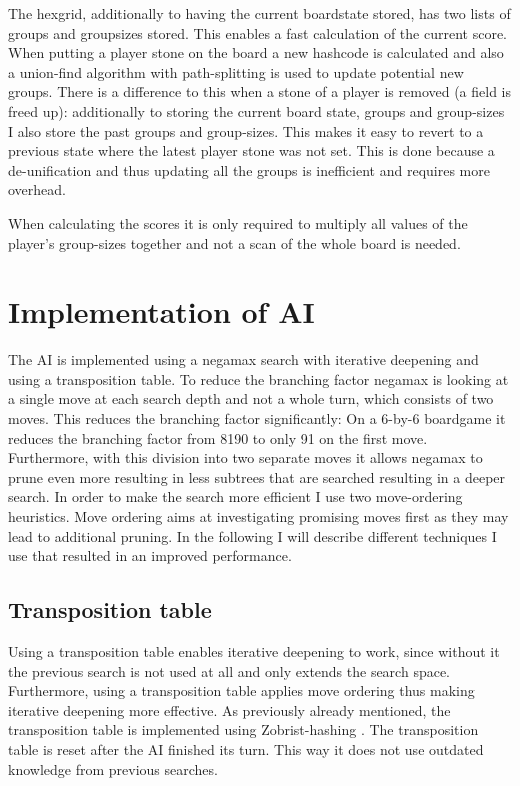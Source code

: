 \documentclass[a4paper]{article}
\begin{document}
The hexgrid, additionally to having the current boardstate stored, has two lists of groups and groupsizes stored. This enables a fast calculation of the current score. When putting a player stone on the board a new hashcode is calculated and also a union-find algorithm \cite{galler1964improved} with path-splitting is used to update potential new groups. There is a difference to this when a stone of a player is removed (a field is freed up): additionally to storing the current board state, groups and group-sizes I also store the past groups and group-sizes. This makes it easy to revert to a previous state where the latest player stone was not set. This is done because a de-unification and thus updating all the groups is inefficient and requires more overhead.

When calculating the scores it is only required to multiply all values of the player's group-sizes together and not a scan of the whole board is needed.


\section{Implementation of AI}
The AI is implemented using a negamax search with iterative deepening and using a transposition table. To reduce the branching factor negamax is looking at a single move at each search depth and not a whole turn, which consists of two moves. This reduces the branching factor significantly: On a 6-by-6 boardgame it reduces the branching factor from 8190 to only 91 on the first move. Furthermore, with this division into two separate moves it allows negamax to prune even more resulting in less subtrees that are searched resulting in a deeper search. In order to make the search more efficient I use two move-ordering heuristics. Move ordering aims at investigating promising moves first as they may lead to additional pruning. In the following I will describe different techniques I use that resulted in an improved performance.

\subsection{Transposition table}
Using a transposition table enables iterative deepening to work, since without it the previous search is not used at all and only extends the search space. Furthermore, using a transposition table applies move ordering thus making iterative deepening more effective. As previously already mentioned, the transposition table is implemented using Zobrist-hashing \cite{galler1964improved}. The transposition table is reset after the AI finished its turn. This way it does not use outdated knowledge from previous searches.
\end{document}
